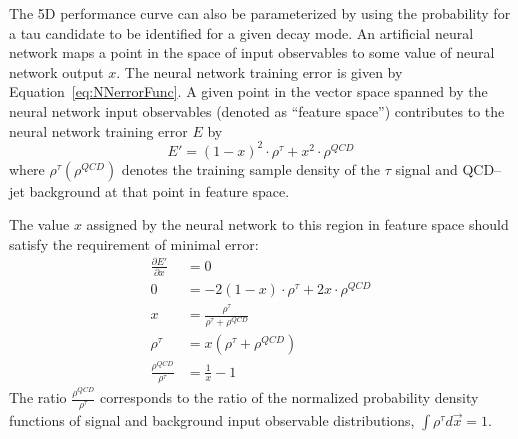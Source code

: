 The 5D performance curve can also be parameterized by using the probability for
a tau candidate to be identified for a given decay mode.  
An artificial neural network maps a point in the space of input observables to
some value of neural network output $x$.  The neural network training error is
given by Equation~\ref{eq:NNerrorFunc}.  A given point in the vector space
spanned by the neural network input observables (denoted as ``feature space'')
contributes to the neural network training error $E$ by 
\begin{equation}
   E' = (1 - x)^2\cdot\rho^\tau + x^2\cdot\rho^{QCD}
   \nonumber
\end{equation}
where $\rho^\tau (\rho^{QCD})$ denotes the training sample density of the
$\tau$ signal and QCD--jet background at that point in feature space.

The value $x$ assigned by the neural network to this region in feature space
should satisfy the requirement of minimal error:
\begin{align}
   \frac{\partial E'}{\partial x} &= 0 \nonumber \\ 
   0 &= -2(1-x)\cdot\rho^\tau+2x\cdot\rho^{QCD} \nonumber \\ 
   x &= \frac{\rho^\tau} {\rho^\tau + \rho^{QCD}} \label{eq:probFracToX} \\ 
   \rho^\tau &= x(\rho^\tau + \rho^{QCD}) \nonumber \\ 
   \frac{\rho^{QCD}}{\rho^\tau} &= \frac{1}{x} - 1  \label{eq:rawTransformX}
\end{align}
The ratio $\frac{\rho^{QCD}}{\rho^\tau}$ corresponds to the ratio of
the normalized probability density functions of signal and background input
observable distributions, \ie $\int \rho^{\tau} d\vec x = 1$.

